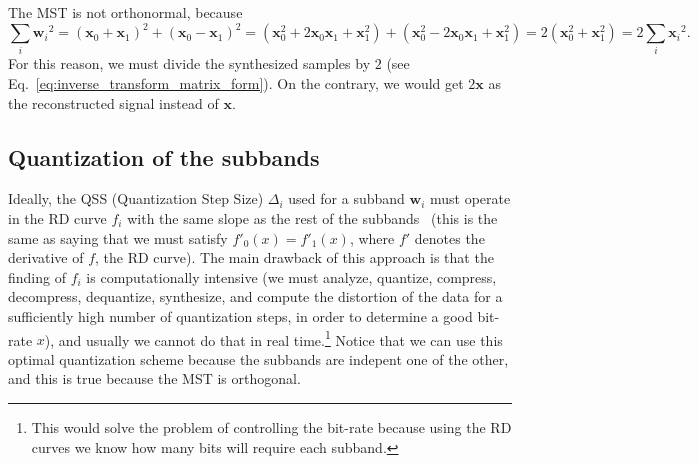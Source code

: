 The MST is not orthonormal, because
\begin{equation}
  \sum_i {{\mathbf w}_i}^2 =
  ({\mathbf x}_0 + {\mathbf x}_1)^2 + ({\mathbf x}_0 - {\mathbf x}_1)^2 =
  ({\mathbf x}_0^2 + 2{\mathbf x}_0{\mathbf x}_1+{\mathbf x}_1^2) + ({\mathbf x}_0^2-2{\mathbf x_0}{\mathbf x}_1+{\mathbf x}_1^2) =
  2({\mathbf x}_0^2+{\mathbf x}_1^2) =
  2\sum_i {{\mathbf x}_i}^2.
  \label{eq:No_Parseval}
\end{equation}
For this reason, we must divide the synthesized samples by $2$ (see
Eq.~\eqref{eq:inverse_transform_matrix_form}). On the contrary, we
would get $2{\mathbf x}$ as the reconstructed signal instead of
${\mathbf x}$.

\subsection{Quantization of the subbands}
\label{sec:quantization_subbands_spatial}

Ideally, the QSS (Quantization Step Size) $\Delta_i$ used for a
subband ${\mathbf w}_i$ must operate in the RD curve $f_i$ with the
same slope as the rest of the
subbands~\cite{vetterli2014foundations,sayood2017introduction} (this
is the same as saying that we must satisfy $f'_0(x)=f'_1(x)$, where
$f'$ denotes the derivative of $f$, the RD curve). The main drawback
of this approach is that the finding of $f_i$ is computationally
intensive (we must analyze, quantize, compress, decompress,
dequantize, synthesize, and compute the distortion of the data for a
sufficiently high number of quantization steps, in order to determine
a good bit-rate $x$), and usually we cannot do that in real
time.\footnote{This would solve the problem of controlling the
  bit-rate because using the RD curves we know how many bits will
  require each subband.} Notice that we can use this optimal
quantization scheme because the subbands are indepent one of the
other, and this is true because the MST is orthogonal.

